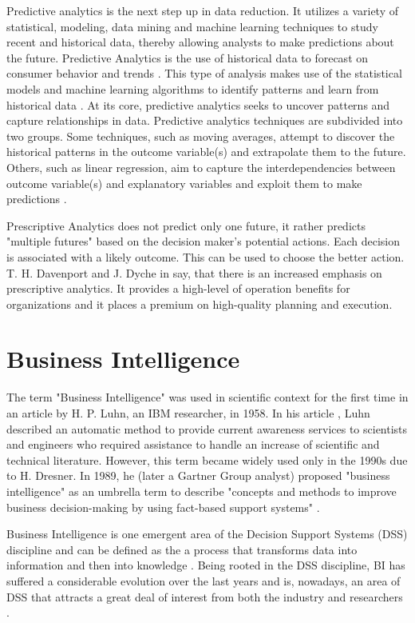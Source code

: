 \documentclass[runningheads]{llncs}
\begin{document}
Predictive analytics is the next step up in data reduction. It utilizes a variety of statistical, modeling, data mining and machine learning techniques to study recent and historical data, thereby allowing analysts to make predictions about the future\cite{CHARTER}. Predictive Analytics is the use of historical data to forecast on consumer behavior and trends \cite{TALLIN}. This type of analysis makes use of the statistical models and machine learning algorithms to identify patterns and learn from historical data \cite{MIS}. At its core, predictive analytics seeks to uncover patterns and capture relationships in data. Predictive analytics techniques are subdivided into two groups. Some techniques, such as moving averages, attempt to discover the historical patterns in the outcome variable(s) and extrapolate them to the future. Others, such as linear regression, aim to capture the interdependencies between outcome variable(s) and explanatory variables and exploit them to make predictions \cite{ELS}.

Prescriptive Analytics does not predict only one future, it rather predicts "multiple futures" based on the decision maker's potential actions. Each decision is associated with a likely outcome. This can be used to choose the better action. T. H. Davenport and J. Dyche in \cite{DAVENPORT} say, that there is an increased emphasis on prescriptive analytics. It provides a high-level of operation benefits for organizations and it places a premium on high-quality planning and execution. 

\section{Business Intelligence}

The term "Business Intelligence" was used in scientific context for the first time in an article by H. P. Luhn, an IBM researcher, in 1958. In his article \cite{LUHN}, Luhn described an automatic method to provide current awareness services to scientists and engineers who required assistance to handle an increase of scientific and technical literature. However, this term became widely used only in the 1990s due to H. Dresner. In 1989, he (later a Gartner Group analyst) proposed "business intelligence" as an umbrella term to describe "concepts and methods to improve business decision-making by using fact-based support systems" \cite{POWER}. 

Business Intelligence is one emergent area of the Decision Support Systems (DSS) discipline and can be defined as the a process that transforms data into information and then into knowledge \cite{GOLFARELLI}. Being rooted in the DSS discipline, BI has suffered a considerable evolution over the last years and is, nowadays, an area of DSS that attracts a great deal of interest from both the industry and researchers \cite{SHOLLO}.
\end{document}
